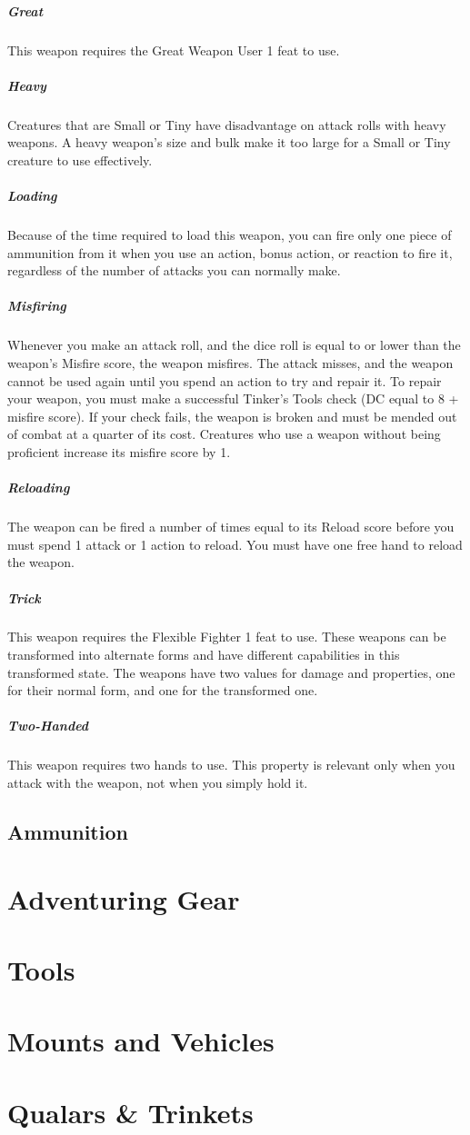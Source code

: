 \subparagraph{Great} This weapon requires the Great Weapon User 1 feat to use.

\subparagraph{Heavy} Creatures that are Small or Tiny have disadvantage on attack rolls with heavy weapons.
A heavy weapon's size and bulk make it too large for a Small or Tiny creature to use effectively.

\subparagraph{Loading} Because of the time required to load this weapon, you can fire only one piece of ammunition from it when you use an action, bonus action, or reaction to fire it, regardless of the number of attacks you can normally make.

\subparagraph{Misfiring} Whenever you make an attack roll, and the dice roll is equal to or lower than the weapon’s Misfire score, the weapon misfires.
The attack misses, and the weapon cannot be used again until you spend an action to try and repair it.
To repair your weapon, you must make a successful Tinker’s Tools check (DC equal to 8 + misfire score).
If your check fails, the weapon is broken and must be mended out of combat at a quarter of its cost.
Creatures who use a weapon without being proficient increase its misfire score by 1.

\subparagraph{Reloading} The weapon can be fired a number of times equal to its Reload score before you must spend 1 attack or 1 action to reload.
You must have one free hand to reload the weapon.

\subparagraph{Trick} This weapon requires the Flexible Fighter 1 feat to use.
These weapons can be transformed into alternate forms and have different capabilities in this transformed state.
The weapons have two values for damage and properties, one for their normal form, and one for the transformed one.

\subparagraph{Two-Handed} This weapon requires two hands to use.
This property is relevant only when you attack with the weapon, not when you simply hold it.

\subsection*{Ammunition} \label{ssec::ammunition}

\section{Adventuring Gear} \label{sec::adventuring}
\section{Tools} \label{sec::tools}
\section{Mounts and Vehicles} \label{sec::adventuring}
\section{Qualars \& Trinkets} \label{sec::trinkets}
